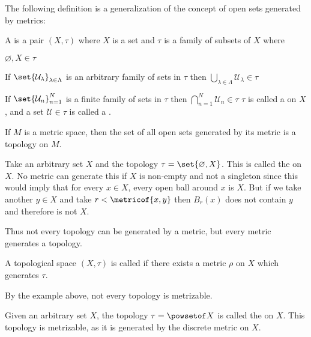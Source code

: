 \documentclass[10pt]{article}
\def\mU{\mathcal{U}}
\begin{document}
The following definition is a generalization of the concept of open sets generated by metrics:

\begin{defn*}

    A  is a pair $(X,\tau)$ where $X$ is a set and $\tau$ is a family of subsets of $X$ where
    \benum
        \item $\varnothing, X\in\tau$
        \item If $\set{\mU_\lambda}_{\lambda\in\Lambda}$ is an arbitrary family of sets in $\tau$ then $\bigcup_{\lambda\in\Lambda}\mU_\lambda\in\tau$
        \item If $\set{\mU_n}_{n=1}^N$ is a finite family of sets in $\tau$ then $\bigcap_{n=1}^N\mU_n\in\tau$
    \eenum
    $\tau$ is called a  on $X$, and a set $\mU\in\tau$ is called a .

\end{defn*}

\begin{exam*}

    If $M$ is a metric space, then the set of all open sets generated by its metric is a topology on $M$.

\end{exam*}

\begin{exam*}

    Take an arbitrary set $X$ and the topology $\tau=\set{\varnothing, X}$.
    This is called the  on $X$.
    No metric can generate this if $X$ is non-empty and not a singleton since this would imply that for every $x\in X$, every open ball around $x$ is $X$.
    But if we take another $y\in X$ and take $r<\metricof{x,y}$ then $B_r(x)$ does not contain $y$ and therefore is not $X$.

    Thus not every topology can be generated by a metric, but every metric generates a topology.

\end{exam*}

\begin{defn*}

    A topological space $(X,\tau)$ is called  if there exists a metric $\rho$ on $X$ which generates $\tau$.

\end{defn*}

By the example above, not every topology is metrizable.

\begin{exam*}

    Given an arbitrary set $X$, the topology $\tau=\powsetof X$ is called the  on $X$.
    This topology is metrizable, as it is generated by the discrete metric on $X$.

\end{exam*}
\end{document}
